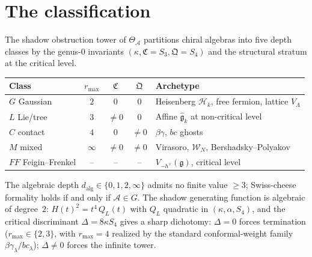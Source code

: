 \documentclass[11pt]{article}
\providecommand{\cA}{\mathcal{A}}
\providecommand{\cH}{\mathcal{H}}
\providecommand{\cW}{\mathcal{W}}
\providecommand{\fg}{\mathfrak{g}}
\begin{document}
\section{The classification}

\noindent
The shadow obstruction tower of $\Theta_\cA$ partitions chiral
algebras into five depth classes by the genus-$0$ invariants
$(\kappa, \mathfrak{C} = S_3, \mathfrak{Q} = S_4)$ and the
structural stratum at the critical level.

\begin{center}
\renewcommand{\arraystretch}{1.3}
\begin{tabular}{lcccl}
\textbf{Class} & $r_{\max}$ & $\mathfrak{C}$ & $\mathfrak{Q}$ & \textbf{Archetype} \\
\hline
$G$ Gaussian & $2$ & $0$ & $0$ & Heisenberg $\cH_k$, free fermion, lattice $V_\Lambda$ \\
$L$ Lie/tree & $3$ & $\ne 0$ & $0$ & Affine $\widehat{\fg}_k$ at non-critical level \\
$C$ contact & $4$ & $0$ & $\ne 0$ & $\beta\gamma$, $bc$ ghosts \\
$M$ mixed & $\infty$ & $\ne 0$ & $\ne 0$ & Virasoro, $\cW_N$, Bershadsky--Polyakov \\
$FF$ Feigin--Frenkel & -- & -- & -- & $V_{-h^\vee}(\fg)$, critical level
\end{tabular}
\end{center}

The algebraic depth $d_{\mathrm{alg}}\in\{0,1,2,\infty\}$ admits no
finite value $\ge 3$; Swiss-cheese formality holds if and only if
$\cA\in G$. The shadow generating function is algebraic of degree~$2$:
$H(t)^2 = t^4\,Q_L(t)$ with $Q_L$ quadratic in $(\kappa,\alpha,S_4)$,
and the critical discriminant $\Delta = 8\kappa S_4$ gives a sharp
dichotomy: $\Delta = 0$ forces termination ($r_{\max}\in\{2,3\}$,
with $r_{\max}=4$ realized by the standard conformal-weight
family $\beta\gamma_\lambda/bc_\lambda$);
$\Delta\ne 0$ forces the infinite tower.
\end{document}

